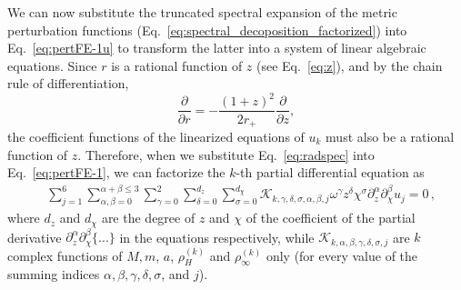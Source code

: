 \documentclass[aps,prx,amsmath,floats,floatfix,twocolumn,
  superscriptaddress,nofootinbib,showpacs]{revtex4-1}
\begin{document}
We can now substitute the truncated spectral expansion of the metric perturbation functions (Eq.~\eqref{eq:spectral_decoposition_factorized}) into Eq.~\eqref{eq:pertFE-1u} to transform the latter into a system of linear algebraic equations. 
Since $r$ is a rational function of $z$ (see Eq.~\eqref{eq:z}), and by the chain rule of differentiation, 
\begin{equation}
\frac{\partial}{\partial r} = - \frac{(1+z)^2}{2 r_+} \frac{\partial}{\partial z}, 
\end{equation}
the coefficient functions of the linearized equations of $u_k$ must also be a rational function of $z$. 
Therefore, when we substitute Eq.~\eqref{eq:radspec} into Eq.~\eqref{eq:pertFE-1}, 
we can factorize the $k$-th partial differential equation as
\begin{equation}\label{eq:system_3}
\begin{split}
& \sum_{j=1}^{6} \sum_{\alpha, \beta = 0}^{\alpha + \beta \leq 3} \sum_{\gamma=0}^{2} \sum_{\delta=0}^{d_{z}} \sum_{\sigma=0}^{d_{\chi}} \mathcal{K}_{k, \gamma, \delta, \sigma, \alpha, \beta, j} \omega^\gamma z^{\delta} \chi^{\sigma} \partial_{z}^{\alpha} \partial_{\chi}^{\beta} u_j = 0 \,, 
\end{split}
\end{equation}
where $d_z$ and $d_{\chi}$ are the degree of $z$ and $\chi$ of the coefficient of the partial derivative $\partial_{z}^{\alpha} \partial_{\chi}^{\beta} \{...\} $ in the equations respectively, while $\mathcal{K}_{k, \alpha, \beta, \gamma, \delta, \sigma, j}$ are $k$ complex functions of $M, m$, $a$, $\rho_H^{(k)}$ and $\rho_{\infty}^{(k)}$ only (for every value of the summing indices $ \alpha, \beta, \gamma, \delta, \sigma$, and $j$). 
\end{document}
